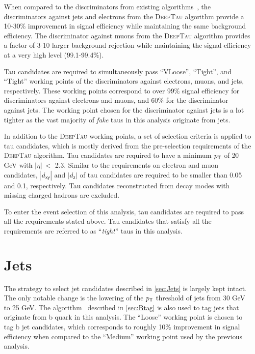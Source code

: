 When compared to the discriminators from existing algorithms~\cite{CMS:2018jrd,CMS:2015pac}, the discriminators against jets and electrons from the \textsc{DeepTau} algorithm provide a 10-30\% improvement in signal efficiency while maintaining the same background efficiency. The discriminator against muons from the \textsc{DeepTau} algorithm provides a factor of 3-10 larger background rejection while maintaining the signal efficiency at a very high level (99.1-99.4\%).

Tau candidates are required to simultaneously pass ``VLoose'', ``Tight'', and ``Tight'' working points of the discriminators against electrons, muons, and jets, respectively. These working points correspond to over 99\% signal efficiency for discriminators against electrons and muons, and 60\% for the discriminator against jets. The working point chosen for the discriminator against jets is a lot tighter as the vast majority of \emph{fake} taus in this analysis originate from jets.

In addition to the \textsc{DeepTau} working points, a set of selection criteria is applied to tau candidates, which is mostly derived from the pre-selection requirements of the \textsc{DeepTau} algorithm. Tau candidates are required to have a minimum $p_{\textsf{T}}$ of 20 GeV with $|\eta|~<$ 2.3. Similar to the requirements on electron and muon candidates, $|d_{\textsf{xy}}|$ and $|d_{\textsf{z}}|$ of tau candidates are required to be smaller than 0.05 and 0.1, respectively. Tau candidates reconstructed from decay modes with missing charged hadrons are excluded.

To enter the event selection of this analysis, tau candidates are required to pass all the requirements stated above. Tau candidates that satisfy all the requirements are referred to as ``\emph{tight}'' taus in this analysis.

\section{Jets}
\label{sec:JME}

The strategy to select jet candidates described in \autoref{sec:Jets} is largely kept intact. The only notable change is the lowering of the $p_{\textsf{T}}$ threshold of jets from 30 GeV to 25 GeV. The \DeepJ algorithm~\cite{Bols:2020bkb} described in \autoref{sec:Btag} is also used to tag jets that originate from b quark in this analysis. The ``Loose'' working point is chosen to tag b jet candidates, which corresponds to roughly 10\% improvement in signal efficiency when compared to the ``Medium'' working point used by the previous analysis.